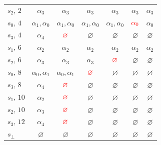 \begin{example}
\begin{table}[h]
\begin{tabular}{l|cccccc}
$s_2, \, 2$  & $\alpha_3$                & $\alpha_3$                                                 & $\alpha_3$                 & $\alpha_3$                 & $\alpha_3$                & $\alpha_3$                \\
$s_0, \, 4$  & $\alpha_1, \alpha_0$      & $\alpha_1, \alpha_0$                                       & $\alpha_1, \alpha_0$       & $\alpha_1, \alpha_0$       & ${\color{red}\alpha_0}$   & $\alpha_0$                \\
$s_3, \, 4$  & $\alpha_4$                & ${\color{red}\varnothing}$                                 & $\varnothing$              & $\varnothing$              & $\varnothing$             & $\varnothing$             \\
$s_1, \, 6$  & $\alpha_2$                & $\alpha_2$                                                 & $\alpha_2$                 & $\alpha_2$                 & $\alpha_2$                & $\alpha_2$                \\
$s_2, \, 6$  & $\alpha_3$                & $\alpha_3$                                                 & $\alpha_3$                 & ${\color{red}\varnothing}$ & $\varnothing$             & $\varnothing$             \\
$s_0, \, 8$  & $\alpha_0, \alpha_1$      & $\alpha_0, \alpha_1$                                       & ${\color{red}\varnothing}$ & $\varnothing$              & $\varnothing$             & $\varnothing$             \\
$s_3, \, 8$  & $\alpha_4$                & ${\color{red}\varnothing}$                                 & $\varnothing$              & $\varnothing$              & $\varnothing$             & $\varnothing$             \\
$s_1, \, 10$ & $\alpha_2$                & ${\color{red}\varnothing}$                                 & $\varnothing$              & $\varnothing$              & $\varnothing$             & $\varnothing$             \\
$s_2, \, 10$ & $\alpha_3$                & ${\color{red}\varnothing}$                                 & $\varnothing$              & $\varnothing$              & $\varnothing$             & $\varnothing$             \\
$s_3, \, 12$ & $\alpha_4$                & ${\color{red}\varnothing}$ & $\varnothing$              & $\varnothing$              & $\varnothing$             & $\varnothing$             \\
$s_\bot$     & $\varnothing$             & $\varnothing$                                              & $\varnothing$              & $\varnothing$              & $\varnothing$             & $\varnothing$

\end{tabular}
\end{table}
\end{example}
